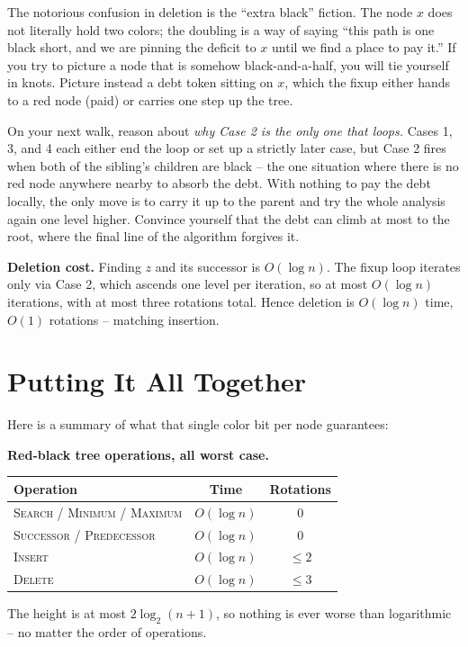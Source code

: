\begin{trapbox}
The notorious confusion in deletion is the ``extra black'' fiction. The node $x$
does not literally hold two colors; the doubling is a way of saying ``this path is
one black short, and we are pinning the deficit to $x$ until we find a place to
pay it.'' If you try to picture a node that is somehow black-and-a-half, you will
tie yourself in knots. Picture instead a debt token sitting on $x$, which the
fixup either hands to a red node (paid) or carries one step up the tree.
\end{trapbox}

\begin{walkbox}
On your next walk, reason about \emph{why Case 2 is the only one that loops.}
Cases 1, 3, and 4 each either end the loop or set up a strictly later case, but
Case 2 fires when both of the sibling's children are black -- the one situation
where there is no red node anywhere nearby to absorb the debt. With nothing to pay
the debt locally, the only move is to carry it up to the parent and try the whole
analysis again one level higher. Convince yourself that the debt can climb at most
to the root, where the final line of the algorithm forgives it.
\end{walkbox}

\begin{complexitybox}
\textbf{Deletion cost.} Finding $z$ and its successor is $O(\log n)$. The fixup
loop iterates only via Case 2, which ascends one level per iteration, so at most
$O(\log n)$ iterations, with at most three rotations total. Hence deletion is
$O(\log n)$ time, $O(1)$ rotations -- matching insertion.
\end{complexitybox}

\section{Putting It All Together}

Here is a summary of what that single color bit per node guarantees:

\begin{complexitybox}
\textbf{Red-black tree operations, all worst case.}
\begin{center}
\begin{tabular}{lcc}
\toprule
Operation & Time & Rotations \\
\midrule
\textsc{Search} / \textsc{Minimum} / \textsc{Maximum} & $O(\log n)$ & $0$ \\
\textsc{Successor} / \textsc{Predecessor} & $O(\log n)$ & $0$ \\
\textsc{Insert} & $O(\log n)$ & $\le 2$ \\
\textsc{Delete} & $O(\log n)$ & $\le 3$ \\
\bottomrule
\end{tabular}
\end{center}
The height is at most $2\log_2(n+1)$, so nothing is ever worse than logarithmic --
no matter the order of operations.
\end{complexitybox}

